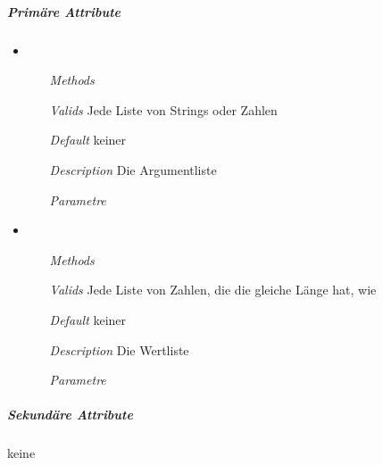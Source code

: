 
\newpage

\subparagraph{Prim\"are Attribute}
\begin{itemize}

\item {}
\begin{enumerate}
\item[\textit{Methods}]
\item[\textit{Valids}] Jede Liste von Strings oder Zahlen
\item[\textit{Default}] keiner
\item[\textit{Description}] Die Argumentliste
\item[\textit{Parametre}] 
\end{enumerate}

\item {}
\begin{enumerate}
\item[\textit{Methods}]
\item[\textit{Valids}] Jede Liste von Zahlen, die die 
gleiche L\"ange hat, wie   
\item[\textit{Default}] keiner
\item[\textit{Description}] Die Wertliste
\item[\textit{Parametre}] 
\end{enumerate}

\end{itemize}


\newpage

\subparagraph{Sekund\"are Attribute}
keine


\newpage

